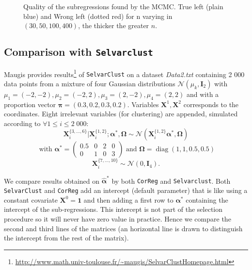 \documentclass[12pt,a4paper]{report}
\begin{document}
\begin{figure}[h!]
	\caption{Quality of the subregressions found by the MCMC. True left (plain blue) and Wrong left (dotted red) for n varying in $(30,50,100,400)$, the thicker the greater $n$.}\label{compZBIC}
\end{figure}


\subsection{Comparison with {\tt Selvarclust}}\label{compMaugis}
		Maugis provides results\footnote{\url{http://www.math.univ-toulouse.fr/~maugis/SelvarClustHomepage.html}} of {\tt SelvarClust} on a dataset {\it Data2.txt} containing 2 000 data points from a mixture of four Gaussian distributions $\mathcal{N}(\mu_k,\boldsymbol{I}_2)$ with $\mu_1=(-2,-2), \mu_2=(-2,2), \mu_3=(2,-2), \mu_4=(2,2)$ and with a proportion vector $\boldsymbol{\pi}=(0.3,0.2,0.3,0.2)$. Variables $\boldsymbol{X}^1,\boldsymbol{X}^2$ corresponds to the coordinates. Eight irrelevant variables (for clustering) are appended, simulated according to $\forall 1\leq i \leq 2\; 000$:
		\begin{displaymath}
		 \boldsymbol{X}_i^{\{3,\dots , 6 \}}|\boldsymbol{X}_i^{\{1,2\}};\boldsymbol{\alpha}^*,\boldsymbol{\Omega} \sim \mathcal{N}(\boldsymbol{X}_i^{\{1,2\}}\boldsymbol{\alpha^*},\boldsymbol{\Omega})
		\end{displaymath}
		\begin{displaymath} \textrm{ with } \boldsymbol{\alpha}^*= \left( \begin{array}{cccc}
		0.5 & 0 & 2 & 0 \\ 
		0 & 1 & 0 & 3
		\end{array} \right) \textrm{ and } \boldsymbol{\Omega}=\operatorname{diag}(1,1,0.5,0.5)
		\end{displaymath}
		\begin{displaymath}
		 \boldsymbol{X}_i^{\{7,\dots , 10 \}}\sim \mathcal{N}(0,\boldsymbol{I}_4).
		\end{displaymath}

We compare results obtained on	$\hat{\boldsymbol{\alpha}}^*$ by both {\tt CorReg} and {\tt Selvarclust}.		
Both {\tt SelvarClust} and {\tt CorReg} add an intercept (default parameter) that is like using a constant covariate $\boldsymbol{X}^0=\boldsymbol{1}$ and then adding a first row to $\boldsymbol{\alpha}^*$ containing the intercept of the sub-regressions. This intercept is not part of the selection procedure so it will never have zero value in practice. Hence we compare the second and third lines of the matrices (an horizontal line is drawn to distinguish the intercept from the rest of the matrix).\\
\end{document}
